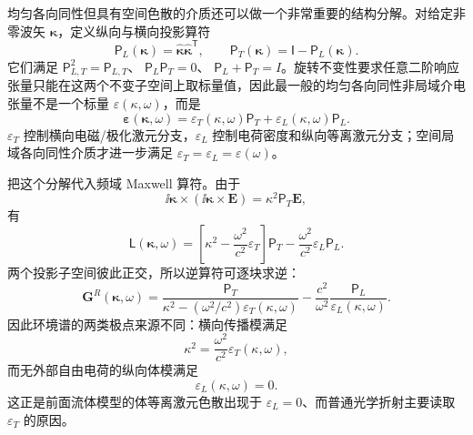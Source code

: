 均匀各向同性但具有空间色散的介质还可以做一个非常重要的结构分解。对给定非零波矢 $\boldsymbol\kappa$，定义纵向与横向投影算符
\begin{equation}
\boxed{
\mathsf P_L(\boldsymbol\kappa)
=\hat{\boldsymbol\kappa}\hat{\boldsymbol\kappa}^{\mathsf T},
\qquad
\mathsf P_T(\boldsymbol\kappa)
=\mathsf I-\mathsf P_L(\boldsymbol\kappa).}
\label{eq:nonlocal_LT_projectors}
\end{equation}
它们满足
$\mathsf P_{L,T}^2=\mathsf P_{L,T}$、
$\mathsf P_L\mathsf P_T=0$、
$\mathsf P_L+\mathsf P_T=I$。旋转不变性要求任意二阶响应张量只能在这两个不变子空间上取标量值，因此最一般的均匀各向同性非局域介电张量不是一个标量 $\varepsilon(\kappa,\omega)$，而是
\begin{equation}
\boxed{
\boldsymbol\varepsilon(\boldsymbol\kappa,\omega)
=\varepsilon_T(\kappa,\omega)\mathsf P_T
+\varepsilon_L(\kappa,\omega)\mathsf P_L.}
\label{eq:isotropic_nonlocal_dielectric_LT_decomposition}
\end{equation}
$\varepsilon_T$ 控制横向电磁/极化激元分支，$\varepsilon_L$ 控制电荷密度和纵向等离激元分支；空间局域各向同性介质才进一步满足
$\varepsilon_T=\varepsilon_L=\varepsilon(\omega)$。

把这个分解代入频域 Maxwell 算符。由于
\[
\ii\boldsymbol\kappa\times
(\ii\boldsymbol\kappa\times\mathbf E)
=\kappa^2\mathsf P_T\mathbf E,
\]
有
\begin{equation*}
\mathsf L(\boldsymbol\kappa,\omega)
=\left[\kappa^2-\frac{\omega^2}{c^2}\varepsilon_T\right]\mathsf P_T
-\frac{\omega^2}{c^2}\varepsilon_L\mathsf P_L.
\end{equation*}
两个投影子空间彼此正交，所以逆算符可逐块求逆：
\begin{equation}
\boxed{
\mathbf G^R(\boldsymbol\kappa,\omega)
=\frac{\mathsf P_T}
{\kappa^2-(\omega^2/c^2)\varepsilon_T(\kappa,\omega)}
-\frac{c^2}{\omega^2}
\frac{\mathsf P_L}{\varepsilon_L(\kappa,\omega)}.}
\label{eq:isotropic_nonlocal_green_LT_decomposition}
\end{equation}
因此环境谱的两类极点来源不同：横向传播模满足
\begin{equation*}
\kappa^2=\frac{\omega^2}{c^2}\varepsilon_T(\kappa,\omega),
\end{equation*}
而无外部自由电荷的纵向体模满足
\begin{equation*}
\varepsilon_L(\kappa,\omega)=0.
\end{equation*}
这正是前面流体模型的体等离激元色散出现于 $\varepsilon_L=0$、而普通光学折射主要读取 $\varepsilon_T$ 的原因。


